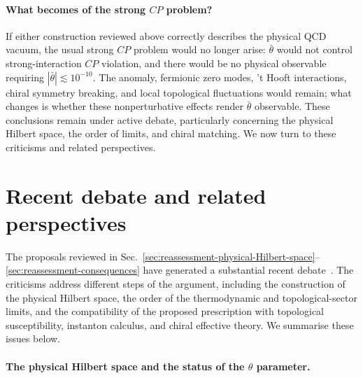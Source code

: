 \documentclass[review]{elsarticle}
\numberwithin{equation}{section}
\numberwithin{table}{section}
\numberwithin{figure}{section}
\begin{document}
\paragraph{What becomes of the strong \texorpdfstring{$CP$}{CP} problem?}

If either construction reviewed above correctly describes the physical QCD vacuum, the usual strong $CP$ problem would no longer arise: $\bar\theta$ would not control strong-interaction $CP$ violation, and there would be no physical observable requiring $|\bar\theta|\lesssim10^{-10}$. The anomaly, fermionic zero modes, 't Hooft interactions, chiral symmetry breaking, and local topological fluctuations would remain; what changes is whether these nonperturbative effects render $\bar\theta$ observable. These conclusions remain under active debate, particularly concerning the physical Hilbert space, the order of limits, and chiral matching. We now turn to these criticisms and related perspectives.

\section{Recent debate and related perspectives}
\label{sec:recent-strong-CP-debate}

The proposals reviewed in Sec.~\ref{sec:reassessment-physical-Hilbert-space}--\ref{sec:reassessment-consequences} have generated a substantial recent debate~\cite{Albandea:2024fui,Benabou:2025viy,Ai:2025quf,Khoze:2025auv,Bhattacharya:2025qsk,Ringwald:2026apz,Aghaie:2026pkf,Kobakhidze:2026ymc}. The criticisms address different steps of the argument, including the construction of the physical Hilbert space, the order of the thermodynamic and topological-sector limits, and the compatibility of the proposed prescription with topological susceptibility, instanton calculus, and chiral effective theory. We summarise these issues below.

\paragraph{The physical Hilbert space and the status of the \texorpdfstring{$\theta$}{theta} parameter.}
\end{document}
